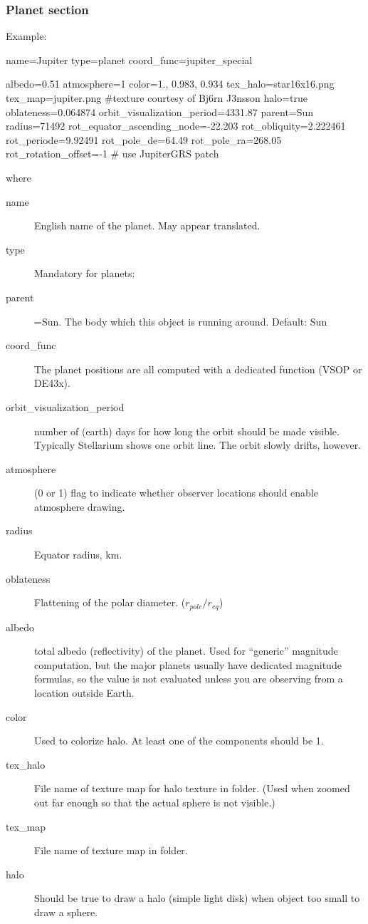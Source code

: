 \subsubsection{Planet section}
\label{sec:ssystem.ini:Planet}

Example:
\begin{configfile}
[jupiter]
name=Jupiter
type=planet  
coord_func=jupiter_special

albedo=0.51
atmosphere=1
color=1., 0.983, 0.934
tex_halo=star16x16.png
tex_map=jupiter.png #texture courtesy of Bj\xf6rn J\xf3nsson
halo=true
oblateness=0.064874
orbit_visualization_period=4331.87
parent=Sun
radius=71492
rot_equator_ascending_node=-22.203
rot_obliquity=2.222461
rot_periode=9.92491
rot_pole_de=64.49
rot_pole_ra=268.05
rot_rotation_offset=-1 # use JupiterGRS patch
\end{configfile}


where 
\begin{description}
\item[name] English name of the planet. May appear translated. 
\item[type] Mandatory for planets: \value{planet}
\item[parent]=Sun. The body which this object is running around. Default: Sun
\item[coord\_func] The planet positions are all computed with a dedicated function (VSOP or DE43x). 
\item[orbit\_visualization\_period] number of (earth) days for how
  long the orbit should be made visible. Typically Stellarium shows
  one orbit line. The orbit slowly drifts, however.

\item[atmosphere] (0 or 1) flag to indicate whether observer locations should enable atmosphere drawing.

\item[radius] Equator radius, km.
\item[oblateness] Flattening of the polar diameter. ($r_{pole}/r_{eq}$)
\item[albedo] total albedo (reflectivity) of the planet. Used for ``generic''
  magnitude computation, but the major planets usually have dedicated
  magnitude formulas, so the value is not evaluated unless you are
  observing from a location outside Earth.
\item[color] Used to colorize halo. At least one of the components should be 1.
\item[tex\_halo] File name of texture map for halo texture in
   folder. (Used when zoomed out far enough so that the
  actual sphere is not visible.)
\item[tex\_map] File name of texture map in  folder.
\item[halo] Should be true to draw a halo (simple light disk) when object too small to draw a sphere.
\end{description}

